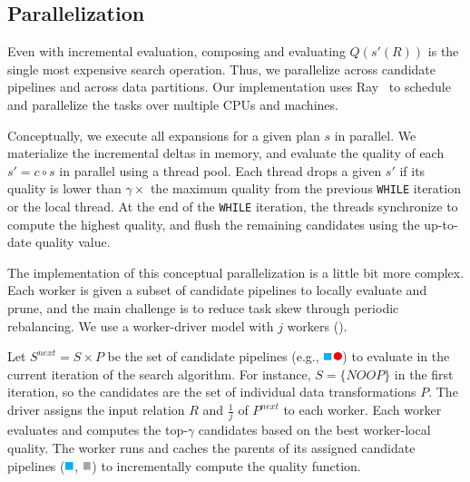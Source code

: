 \subsection{Parallelization} 
Even with incremental evaluation, composing and evaluating $Q(s'(R))$ is the single most expensive search operation.  Thus, we parallelize across candidate pipelines and across data partitions.  Our implementation uses Ray~\cite{ray} to schedule and parallelize the tasks over multiple CPUs and machines.

Conceptually, we execute all expansions for a given plan $s$ in parallel.  We materialize the incremental deltas in memory, and evaluate the quality of each $s' = c\circ s$ in parallel using a thread pool.  Each thread drops a given $s'$ if its quality is lower than $\gamma\times$ the maximum quality from the previous \texttt{WHILE} iteration or the local thread.  At the end of the \texttt{WHILE} iteration, the threads synchronize to compute the highest quality, and flush the remaining candidates using the up-to-date quality value.


The implementation of this conceptual parallelization is a little bit more complex. 
Each worker is given a subset of candidate pipelines to locally evaluate and prune, and the main challenge is to reduce task skew through periodic rebalancing.  We use a worker-driver model with $j$ workers ().

Let $S^{next} = S\times P$ be the set of candidate pipelines (e.g., \includegraphics[height=8pt]{figures/program.pdf}) to evaluate in the current iteration of the search algorithm. For instance, $S=\{NOOP\}$ in the first iteration, so the candidates are the set of individual data transformations $P$.   The driver assigns the input relation $R$ and $\frac{1}{j}$ of $P^{next}$ to each worker.   Each worker evaluates and computes the top-$\gamma$ candidates based on the best worker-local quality.   The worker runs and caches the parents of its assigned candidate pipelines (\includegraphics[height=8pt]{figures/sq-blue.pdf}, \includegraphics[height=8pt]{figures/sq-grey.pdf}) to incrementally compute the quality function.
  
